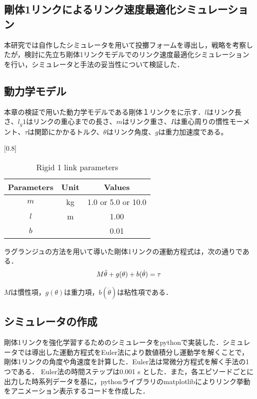 \begin{small}
\section{剛体1リンクによるリンク速度最適化シミュレーション}
本研究では自作したシミュレータを用いて投擲フォームを導出し，戦略を考察したが，検討に先立ち剛体1リンクモデルでのリンク速度最適化シミュレーションを行い，シミュレータと手法の妥当性について検証した．
\subsection{動力学モデル}
本章の検証で用いた動力学モデルである剛体１リンクをに示す．$l$はリンク長さ、$l_g{1}$はリンクの重心までの長さ、$m$はリンク重さ、$I$は重心周りの慣性モーメント、$\tau$は関節にかかるトルク、$\theta$はリンク角度、$g$は重力加速度である。
\begin{table}[tb]
  \begin{center}
    \caption{Rigid 1 link parameters}
    \scalebox{0.8}[0.8]{
    \begin{tabular}{c|c|c}
      \hline
      Parameters & Unit & Values \\
      \hline
      $m$ & kg & 1.0 or 5.0 or 10.0\\
      $l$ & m & 1.00 \\
      $b$ &  & 0.01 \\
      \hline
    \end{tabular}
    }
  \end{center}
\end{table}
ラグランジュの方法\cite{lagrange}を用いて導いた剛体1リンクの運動方程式は，次の通りである．\\
\begin{eqnarray}
  \equlabel{2}
  M\ddot{\theta} + g(\theta) + b(\dot{\theta}) = \tau
\end{eqnarray}


$M$は慣性項，$g(\theta)$は重力項，$b(\dot{\theta})$は粘性項である．
\subsection{シミュレータの作成}
剛体1リンクを強化学習するためのシミュレータをpythonで実装した．シミュレータでは導出した運動方程式をEuler法\cite{euler}により数値積分し運動学を解くことで，剛体1リンクの角度や角速度を計算した．Euler法は常微分方程式を解く手法の1つである．
Euler法の時間ステップは0.001 s とした．また，各エピソードごとに出力した時系列データを基に，pythonライブラリのmatplotlibによりリンク挙動をアニメーション表示するコードを作成した．

\end{small}
